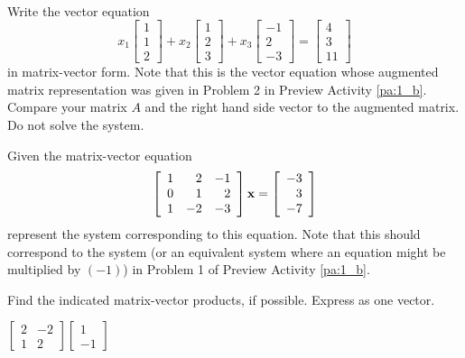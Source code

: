\begin{pa} \label{pa:1_e} ~
\be

\item Write the vector equation
\[x_1 \left[ \begin{array}{c} 1 \\ 1 \\ 2 \end{array} \right] +x_2 \left[ \begin{array}{c}  1\\ 2\\ 3 \end{array} \right] + x_3 \left[ \begin{array}{r} -1 \\ 2 \\ -3 \end{array} \right] = \left[ \begin{array}{c} 4 \\ 3\\ 11 \end{array} \right] \]
in matrix-vector form. Note that this is the vector equation whose augmented matrix representation was given in Problem 2 in Preview Activity \ref{pa:1_b}. Compare your matrix $A$ and the right hand side vector to the augmented matrix. Do not solve the system.

\item Given the matrix-vector equation
\[ \left[ \begin{array}{crr} 1 & 2 & -1 \\ 0&1&2\\1&-2&-3 \end{array} \right] \mathbf{x} = \left[\begin{array}{r} -3\\3\\-7 \end{array}\right] \]
represent the system corresponding to this equation. Note that this should correspond to the system (or an equivalent system where an equation might be multiplied by $(-1)$) in Problem 1 of Preview Activity \ref{pa:1_b}.


\item Find the indicated matrix-vector products, if possible. Express as one vector.
    \ba
    \item $\left[ \begin{array}{cr} 2& -2 \\ 1& 2 \end{array} \right] \left[ \begin{array}{r} 1 \\ -1 \end{array} \right]$


\end{pa}

